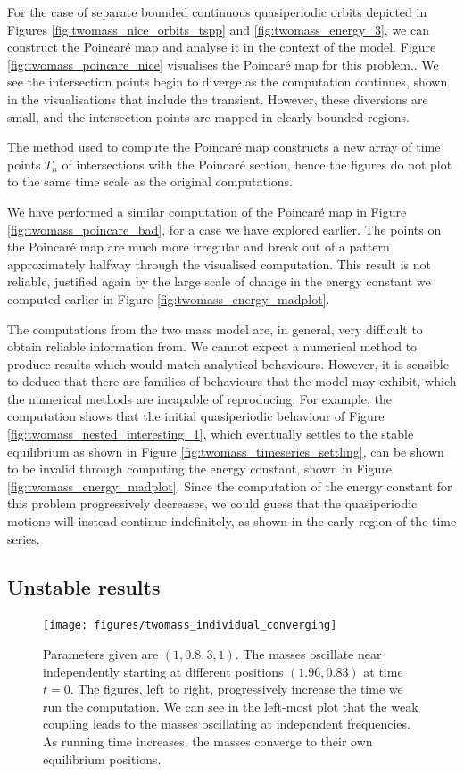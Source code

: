 \documentclass{report}
\begin{document}
For the case of separate bounded continuous quasiperiodic orbits depicted in Figures \ref{fig:twomass_nice_orbits_tspp} and \ref{fig:twomass_energy_3},
we can construct the Poincar\'e map and analyse it in the context of the model.
Figure \ref{fig:twomass_poincare_nice} visualises the Poincar\'e map for this problem..
We see the intersection points begin to diverge as the computation continues,
shown in the visualisations that include the transient.
However, these diversions are small,
and the intersection points are mapped in clearly bounded regions.

The method used to compute the Poincar\'e map \cite{manohar_2011} constructs a new array of time points $T_n$ of intersections with the Poincar\'e section,
hence the figures do not plot to the same time scale as the original computations.

We have performed a similar computation of the Poincar\'e map in Figure \ref{fig:twomass_poincare_bad},
for a case we have explored earlier.
The points on the Poincar\'e map are much more irregular and break out of a pattern approximately halfway through the visualised computation.
This result is not reliable, justified again by the large scale of change in the energy constant we computed earlier in Figure \ref{fig:twomass_energy_madplot}.

The computations from the two mass model are, in general, very difficult to obtain reliable information from.
We cannot expect a numerical method to produce results which would match analytical behaviours.
However, it is sensible to deduce that there are families of behaviours that the model may exhibit,
which the numerical methods are incapable of reproducing.
For example, the computation shows that the initial quasiperiodic behaviour of Figure \ref{fig:twomass_nested_interesting_1},
which eventually settles to the stable equilibrium as shown in Figure \ref{fig:twomass_timeseries_settling},
can be shown to be invalid through computing the energy constant, shown in Figure \ref{fig:twomass_energy_madplot}.
Since the computation of the energy constant for this problem progressively decreases,
we could guess that the quasiperiodic motions will instead continue indefinitely, as shown in the early region of the time series.

\subsection{Unstable results}

\begin{figure}[h]
	\centering
	\texttt{[image: figures/twomass\_individual\_converging]}
	\caption{
		Parameters given are \((1, 0.8, 3, 1)\). The masses oscillate near independently starting at different positions $(1.96, 0.83)$ at time $t=0$.
		The figures, left to right, progressively increase the time we run the computation.
		We can see in the left-most plot that the weak coupling leads to the masses oscillating at independent frequencies.
		As running time increases, the masses converge to their own equilibrium positions.
	}
	\label{fig:twomass_independent}
\end{figure}
\end{document}
